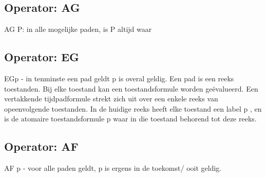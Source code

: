\documentclass{article}
\begin{document}
	\subsection{Operator: AG}
	
	
	AG P: in alle mogelijke paden, is P altijd waar
	
	
	
	\subsection{Operator: EG}
	EGp - in tenminste een pad geldt p is overal geldig.
	Een pad is een reeks toestanden. Bij elke toestand kan een toestandsformule worden geëvalueerd. Een vertakkende tijdpadformule strekt zich uit over een enkele reeks van opeenvolgende toestanden.
	In de huidige reeks heeft elke toestand een label p , en  is de atomaire toestandsformule p waar in die toestand behorend tot deze reeks.
	
	
	\subsection{Operator: AF}
	AF p - voor alle paden geldt, p is ergens in de toekomst/ ooit geldig.
	
\end{document}
